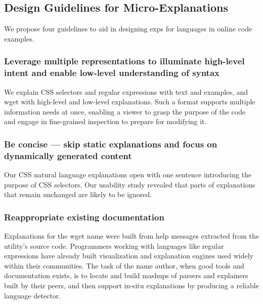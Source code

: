 \begin{changes}
\subsection{Design Guidelines for Micro-Explanations}
We propose four guidelines to aid in designing \glspl{exp} for languages in online code examples.

\subsubsection{Leverage multiple representations to illuminate high-level intent and enable low-level understanding of syntax}
We explain CSS selectors and regular expressions with text and examples, and wget with high-level and low-level explanations.
Such a format supports multiple information needs at once, enabling a viewer to grasp the purpose of the code and engage in fine-grained inspection to prepare for modifying it.

\subsubsection{Be concise --- skip static explanations and focus on dynamically generated content}
Our CSS natural language explanations open with one sentence introducing the purpose of CSS selectors.
Our usability study revealed that parts of explanations that remain unchanged are likely to be ignored. %

\subsubsection{Reappropriate existing documentation}
Explanations for the wget \Gls{name} were built from help messages extracted from the utility's source code.
Programmers working with languages like regular expressions have already built visualization and explanation engines used widely within their communities.
The task of the \Gls{name} author, when good tools and documentation exists, is to locate and build mashups of parsers and explainers built by their peers, and then support in-situ explanations by producing a reliable language detector.


\end{changes}
